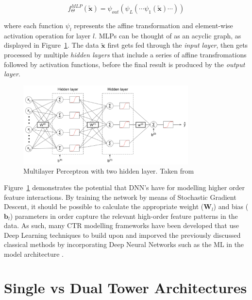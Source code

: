\documentclass{mldsmsc}
\begin{document}
\begin{equation}
\label{eqn:mlp-2}
f_{\Theta}^{MLP}(\tilde{\mathbf{x}}) = \psi_{out} \left( \psi_{L} \left( \cdots \psi_{1} \left( 
    \tilde{\mathbf{x}} \right) \cdots \right) \right)
\end{equation}

where each function $\psi_{l}$ represents the affine transformation and element-wise activation
operation for layer $l$. MLPs can be thought of as an acyclic graph, as displayed in
Figure~\ref{fig:mlp}. The data $\tilde{\mathbf{x}}$ first gets fed through the
\emph{input layer}, then gets processed by multiple \emph{hidden layers} that include
a series of affine transfromations followed by activation functions, before the final
result is produced by the \emph{output layer}.

\begin{figure}[h]
    \centering
    \includegraphics[width=0.8\textwidth]{../figures/ann_two_hidden_layers.png}
    \caption{Multilayer Perceptron with two hidden layer. Taken from \citep{RefWorks:webster2024week}}
    \label{fig:mlp}
\end{figure}

Figure~\ref{fig:mlp} demonstrates the potential that DNN's have for modelling higher order feature
interactions. By training the network by means of Stochastic Gradient Descent, it should be
possible to calculate the appropriate weight ($\mathbf{W}_l$) and bias ($\mathbf{b}_l$) parameters
in order capture the relevant high-order feature patterns in the data. As such, many CTR
modelling frameworks have been developed that use Deep Learning techniques to build upon and
imporved the previously discussed classical methods by incorporating Deep Neural Networks such
as the ML in the model architecture \citep{RefWorks:zhang2021deep}.

\section{Single vs Dual Tower Architectures}
\end{document}
